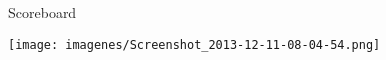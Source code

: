 \documentclass[11pt]{article} %
\begin{document}
\begin{center}
Scoreboard

\texttt{[image: imagenes/Screenshot\_2013-12-11-08-04-54.png]}
\end{center}













  
\end{document}
